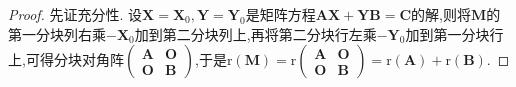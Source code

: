\documentclass[../../main.tex]{subfiles}%
\begin{document}
\begin{proof}

先证充分性. 设\(\boldsymbol{X}=\boldsymbol{X}_0,\boldsymbol{Y}=\boldsymbol{Y}_0\)是矩阵方程\(\boldsymbol{A}\boldsymbol{X}+\boldsymbol{Y}\boldsymbol{B}=\boldsymbol{C}\)的解,则将\(\boldsymbol{M}\)的第一分块列右乘\(-\boldsymbol{X}_0\)加到第二分块列上,再将第二分块行左乘\(-\boldsymbol{Y}_0\)加到第一分块行上,可得分块对角阵\(\begin{pmatrix}
\boldsymbol{A}&\boldsymbol{O}\\
\boldsymbol{O}&\boldsymbol{B}
\end{pmatrix}\),于是\(\mathrm{r}(\boldsymbol{M})=\mathrm{r}\begin{pmatrix}
\boldsymbol{A}&\boldsymbol{O}\\
\boldsymbol{O}&\boldsymbol{B}
\end{pmatrix}=\mathrm{r}(\boldsymbol{A})+\mathrm{r}(\boldsymbol{B})\).


\end{proof}
\end{document}
